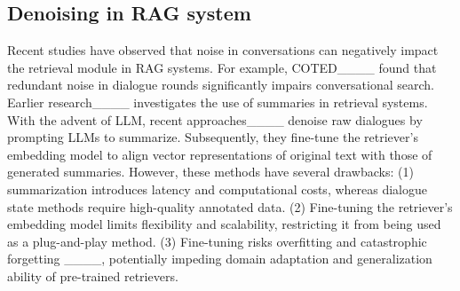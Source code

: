 \subsection{Denoising in RAG system}
Recent studies have observed that noise in conversations can negatively impact the retrieval module in RAG systems. For example, COTED____ found that redundant noise in dialogue rounds significantly impairs conversational search. 
Earlier research____ investigates the use of summaries in retrieval systems. With the advent of LLM, recent approaches____ denoise raw dialogues by prompting LLMs to summarize. Subsequently, they fine-tune the retriever's embedding model to align vector representations of original text with those of generated summaries. However, these methods have several drawbacks: (1) summarization introduces latency and computational costs, whereas dialogue state methods require high-quality annotated data. (2) Fine-tuning the retriever's embedding model limits flexibility and scalability, restricting it from being used as a plug-and-play method. (3) Fine-tuning risks overfitting and catastrophic forgetting ____, potentially impeding domain adaptation and generalization ability of pre-trained retrievers.